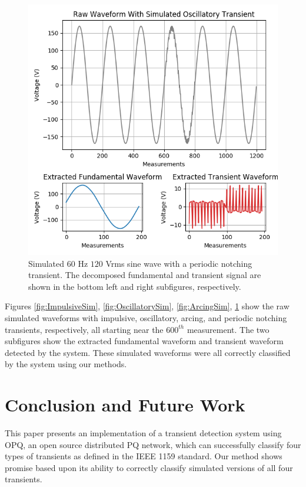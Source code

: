 \documentclass[10pt, conference, compsocconf]{IEEEtran}
\begin{document}
\begin{figure}[htbp]
\centering%
\includegraphics[scale=0.35]{./figures/notching_sim.png}
\caption{Simulated $60$ Hz $120$ Vrms sine wave with a periodic notching transient. The decomposed fundamental and transient signal are shown in the bottom left and right subfigures, respectively.}\label{fig:NotchingSim}
\end{figure}

Figures \ref{fig:ImpulsiveSim}, \ref{fig:OscillatorySim}, \ref{fig:ArcingSim}, \ref{fig:NotchingSim} show the raw simulated waveforms with impulsive, oscillatory, arcing, and periodic notching transients, respectively, all starting near the $600^{th}$ measurement. The two subfigures show the extracted fundamental waveform and transient waveform detected by the system. These simulated waveforms were all correctly classified by the system using our methods. 

\section{Conclusion and Future Work}
\label{sec:Conlcusion}

This paper presents an implementation of a transient detection system using OPQ, an open source distributed PQ network, which can successfully classify four types of transients as defined in the IEEE 1159 standard. Our method shows promise based upon its ability to correctly classify simulated versions of all four transients.
\end{document}

